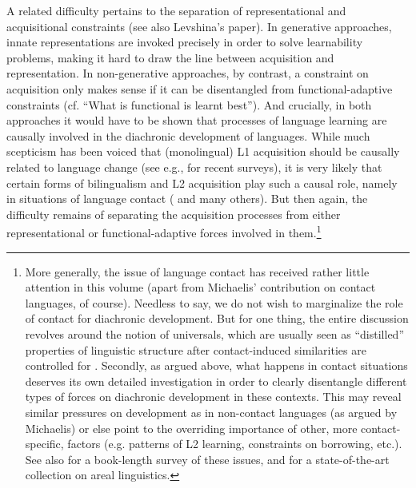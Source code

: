 \documentclass[output=paper]{langsci/langscibook}
\begin{document}
A related difficulty pertains to the separation of representational and acquisitional constraints (see also Levshina’s paper). In generative approaches, innate representations are invoked precisely in order to solve learnability problems, making it hard to draw the line between acquisition and representation. In non-generative approaches, by contrast, a constraint on acquisition only makes sense if it can be disentangled from functional-adaptive constraints (cf. “What is functional is learnt best”). And crucially, in both approaches it would have to be shown that processes of language learning are causally involved in the diachronic development of languages. While much scepticism has been voiced that (monolingual) L1 acquisition should be causally related to language change (see e.g., \citealt{Croft2000,HeineKuteva2007,Diessel2011_Acq} for recent surveys), it is very likely that certain forms of bilingualism and L2 acquisition play such a causal role, namely in situations of language contact (\citealt{Matras2009,MeiselEtAl2013,Gast2017} and many others). But then again, the difficulty remains of separating the acquisition processes from either representational or functional-adaptive forces involved in them.\footnote{More generally, the issue of language contact has received rather little attention in this volume (apart from Michaelis’ contribution on contact languages, of course). Needless to say, we do not wish to marginalize the role of contact for diachronic development. But for one thing, the entire discussion revolves around the notion of universals, which are usually seen as “distilled” properties of linguistic structure after contact-induced similarities are controlled for \citep{Bickel2011_Modelling}. Secondly, as argued above, what happens in contact situations deserves its own detailed investigation in order to clearly disentangle different types of forces on diachronic development in these contexts. This may reveal similar pressures on development as in non-contact languages (as argued by Michaelis) or else point to the overriding importance of other, more contact-specific, factors (e.g. patterns of L2 learning, constraints on borrowing, etc.). See also \citet{Matras2009} for a book-length survey of these issues, and \citet{Hickey2017} for a state-of-the-art collection on areal linguistics.}
\end{document}
